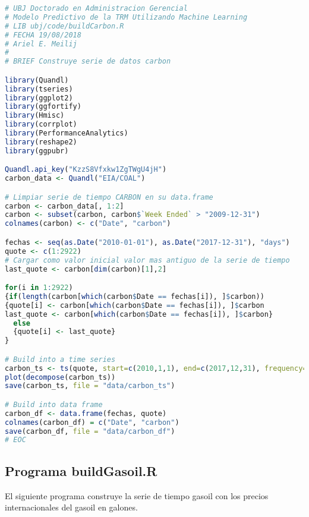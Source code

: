 \begin{lstlisting}[language=R]
# UBJ Doctorado en Administracion Gerencial
# Modelo Predictivo de la TRM Utilizando Machine Learning
# LIB ubj/code/buildCarbon.R
# FECHA 19/08/2018
# Ariel E. Meilij
#
# BRIEF Construye serie de datos carbon

library(Quandl)
library(tseries)
library(ggplot2)
library(ggfortify)
library(Hmisc)
library(corrplot)
library(PerformanceAnalytics)
library(reshape2)
library(ggpubr)

Quandl.api_key("KzzS8Vfxkw1ZgTWgU4jH")
carbon_data <- Quandl("EIA/COAL")

# Limpiar serie de tiempo CARBON en su data.frame
carbon <- carbon_data[, 1:2]
carbon <- subset(carbon, carbon$`Week Ended` > "2009-12-31")
colnames(carbon) <- c("Date", "carbon")

fechas <- seq(as.Date("2010-01-01"), as.Date("2017-12-31"), "days")
quote <- c(1:2922)
# Cargar como valor inicial valor mas antiguo de la serie de tiempo
last_quote <- carbon[dim(carbon)[1],2]

for(i in 1:2922)
{if(length(carbon[which(carbon$Date == fechas[i]), ]$carbon))
{quote[i] <- carbon[which(carbon$Date == fechas[i]), ]$carbon
last_quote <- carbon[which(carbon$Date == fechas[i]), ]$carbon}
  else
  {quote[i] <- last_quote}
}

# Build into a time series
carbon_ts <- ts(quote, start=c(2010,1,1), end=c(2017,12,31), frequency=365)
plot(decompose(carbon_ts))
save(carbon_ts, file = "data/carbon_ts")

# Build into data frame
carbon_df <- data.frame(fechas, quote)
colnames(carbon_df) = c("Date", "carbon")
save(carbon_df, file = "data/carbon_df")
# EOC
\end{lstlisting}

\subsection{Programa buildGasoil.R}
El siguiente programa construye la serie de tiempo gasoil con los precios internacionales del gasoil en galones.

